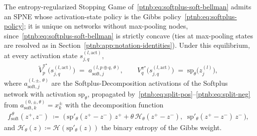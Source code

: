 \begin{theoremenv}\label{ptnb:thm:softplus-forward}\label{prop:softplus_game}
The entropy-regularized Stopping Game of~\eqref{ptnb:eq:softplus-soft-bellman} admits an SPNE whose
activation-state policy is the Gibbs policy~\eqref{ptnb:eq:softplus-policy}; it is unique on networks
without max-pooling nodes, since~\eqref{ptnb:eq:softplus-soft-bellman} is strictly concave (ties at
max-pooling states are resolved as in Section~\ref{ptnb:app:notation-identities}). Under this
equilibrium, at every activation state $s_{j,q}^{(l, \mathrm{act})}$,
\begin{align}\label{ptnb:eq:softplus-spne-tildes}
    \tilde V_p^{\pi^\star}\!\bigl(s_{j,q}^{(l, \mathrm{act})}\bigr)
    \;=\;
    a_{\mathrm{soft},j}^{(l, p \oplus q,\,\theta)},
    \qquad
    V_q^{\pi^\star}\!\bigl(s_{j,q}^{(l, \mathrm{act})}\bigr)
    \;=\;
    \mathrm{sp}_\theta\!\bigl(z_j^{(l)}\bigr),
\end{align}
where $a_{\mathrm{soft},j}^{(l, \pm,\,\theta)}$ are the Softplus-Decomposition activations of the
Softplus network with activation $\mathrm{sp}_\theta$, propagated
by~\eqref{ptnb:eq:split-pos}--\eqref{ptnb:eq:split-neg} from $a_{\mathrm{soft},k}^{(0,\pm,\theta)} = x_k^\pm$
with the decomposition function
\begin{align}\label{ptnb:eq:softplus-decomp}
    f_{\mathrm{soft}}^{\,\theta}(z^+, z^-) \;\coloneqq\; \bigl(\,\mathrm{sp}'_\theta(z^+ - z^-)\, z^+ +
    \theta\, \mathcal{H}_\theta(z^+ - z^-),\;\; \mathrm{sp}'_\theta(z^+ - z^-)\, z^-\,\bigr),
\end{align}
and $\mathcal{H}_\theta(z) \coloneqq \mathcal{H}(\mathrm{sp}'_\theta(z))$ the binary entropy of the
Gibbs weight.\end{theoremenv}


